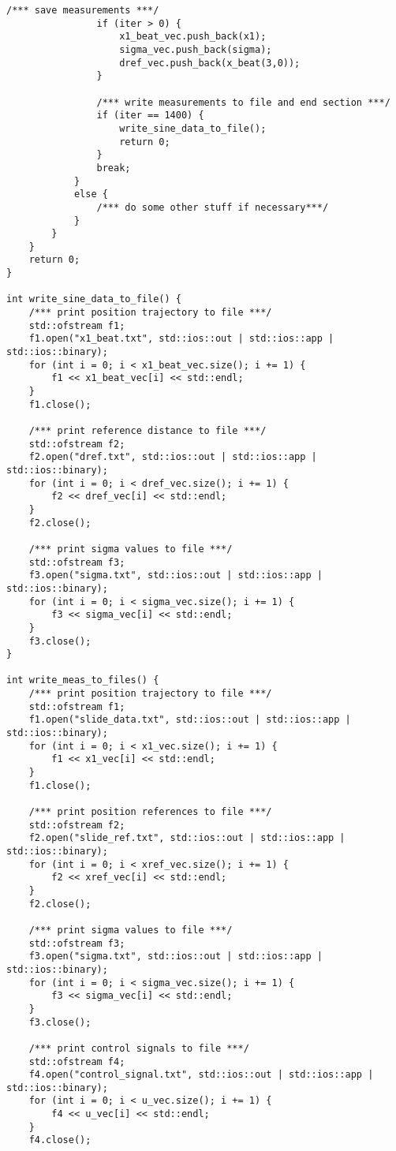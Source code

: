 \begin{lstlisting}[language=gedit]
                /*** save measurements ***/
                if (iter > 0) {
                    x1_beat_vec.push_back(x1);
                    sigma_vec.push_back(sigma);
                    dref_vec.push_back(x_beat(3,0));
                }

                /*** write measurements to file and end section ***/
                if (iter == 1400) {
                    write_sine_data_to_file();
                    return 0;
                }
                break;
            }
            else {
                /*** do some other stuff if necessary***/
            }
        }
    }
    return 0;
}

int write_sine_data_to_file() {
    /*** print position trajectory to file ***/
    std::ofstream f1;
    f1.open("x1_beat.txt", std::ios::out | std::ios::app | std::ios::binary);
    for (int i = 0; i < x1_beat_vec.size(); i += 1) {
        f1 << x1_beat_vec[i] << std::endl;
    }
    f1.close();

    /*** print reference distance to file ***/
    std::ofstream f2;
    f2.open("dref.txt", std::ios::out | std::ios::app | std::ios::binary);
    for (int i = 0; i < dref_vec.size(); i += 1) {
        f2 << dref_vec[i] << std::endl;
    }
    f2.close();

    /*** print sigma values to file ***/
    std::ofstream f3;
    f3.open("sigma.txt", std::ios::out | std::ios::app | std::ios::binary);
    for (int i = 0; i < sigma_vec.size(); i += 1) {
        f3 << sigma_vec[i] << std::endl;
    }
    f3.close();
}

int write_meas_to_files() {
    /*** print position trajectory to file ***/
    std::ofstream f1;
    f1.open("slide_data.txt", std::ios::out | std::ios::app | std::ios::binary);
    for (int i = 0; i < x1_vec.size(); i += 1) {
        f1 << x1_vec[i] << std::endl;
    }
    f1.close();

    /*** print position references to file ***/
    std::ofstream f2;
    f2.open("slide_ref.txt", std::ios::out | std::ios::app | std::ios::binary);
    for (int i = 0; i < xref_vec.size(); i += 1) {
        f2 << xref_vec[i] << std::endl;
    }
    f2.close();

    /*** print sigma values to file ***/
    std::ofstream f3;
    f3.open("sigma.txt", std::ios::out | std::ios::app | std::ios::binary);
    for (int i = 0; i < sigma_vec.size(); i += 1) {
        f3 << sigma_vec[i] << std::endl;
    }
    f3.close();

    /*** print control signals to file ***/
    std::ofstream f4;
    f4.open("control_signal.txt", std::ios::out | std::ios::app | std::ios::binary);
    for (int i = 0; i < u_vec.size(); i += 1) {
        f4 << u_vec[i] << std::endl;
    }
    f4.close();


\end{lstlisting}
